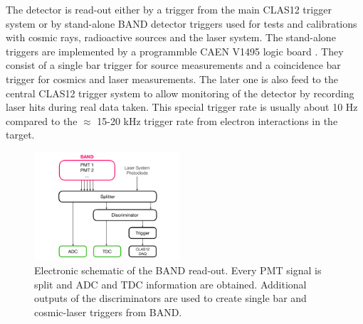 \documentclass[3p,final,twocolumn]{elsarticle}
\begin{document}
The detector is read-out either by a trigger from the main CLAS12 trigger system \cite{clas12-trigger} or by stand-alone BAND detector triggers used for tests and calibrations with cosmic rays, radioactive sources and the laser system. The stand-alone triggers are implemented by a programmble CAEN V1495 logic board \cite{caen-logicboard}. They consist of a single bar trigger for source measurements and a coincidence bar trigger for cosmics and laser measurements. The later one is also feed to the central CLAS12 trigger system to allow monitoring of the detector by recording laser hits during real data taken. This special trigger rate is usually about 10 \si{\hertz} compared to the $\approx$ 15-20 \si{\kilo\hertz} trigger rate from electron interactions in the target.

\begin{figure}[tb]
	\centering
	\includegraphics[width=0.48\textwidth]{electronics-diag.pdf}
	\caption{Electronic schematic of the BAND read-out. Every PMT signal is split and ADC and TDC information are obtained. Additional outputs of the discriminators are used to create single bar and cosmic-laser triggers from BAND.}
	\label{fig:electronic-diag}
\end{figure}


\end{document}
